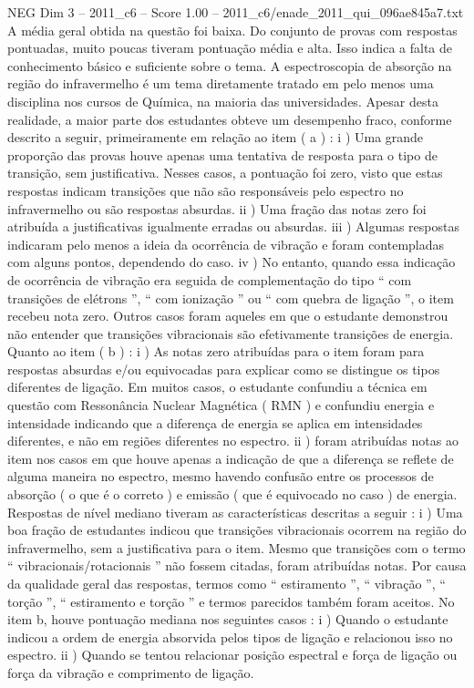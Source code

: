 \begin{textsample}{NEG Dim 3 – 2011\_c6 – Score 1.00 – 2011\_c6/enade\_2011\_qui\_096ae845a7.txt}
A média geral obtida na questão foi baixa.
Do conjunto de provas com respostas pontuadas, muito poucas tiveram pontuação média e alta.
Isso indica a falta de conhecimento básico e suficiente sobre o tema.
A espectroscopia de absorção na região do infravermelho é um tema diretamente tratado em pelo menos uma disciplina nos cursos de Química, na maioria das universidades.
Apesar desta realidade, a maior parte dos estudantes obteve um desempenho fraco, conforme descrito a seguir, primeiramente em relação ao item ( a ) : i ) Uma grande proporção das provas houve apenas uma tentativa de resposta para o tipo de transição, sem justificativa.
Nesses casos, a pontuação foi zero, visto que estas respostas indicam transições que não são responsáveis pelo espectro no infravermelho ou são respostas absurdas. ii ) Uma fração das notas zero foi atribuída a justificativas igualmente erradas ou absurdas. iii ) Algumas respostas indicaram pelo menos a ideia da ocorrência de vibração e foram contempladas com alguns pontos, dependendo do caso. iv ) No entanto, quando essa indicação de ocorrência de vibração era seguida de complementação do tipo “ com transições de elétrons ”, “ com ionização ” ou “ com quebra de ligação ”, o item recebeu nota zero.
Outros casos foram aqueles em que o estudante demonstrou não entender que transições vibracionais são efetivamente transições de energia.
Quanto ao item ( b ) : i ) As notas zero atribuídas para o item foram para respostas absurdas e/ou equivocadas para explicar como se distingue os tipos diferentes de ligação.
Em muitos casos, o estudante confundiu a técnica em questão com Ressonância Nuclear Magnética ( RMN ) e confundiu energia e intensidade indicando que a diferença de energia se aplica em intensidades diferentes, e não em regiões diferentes no espectro. ii ) foram atribuídas notas ao item nos casos em que houve apenas a indicação de que a diferença se reflete de alguma maneira no espectro, mesmo havendo confusão entre os processos de absorção ( o que é o correto ) e emissão ( que é equivocado no caso ) de energia.
Respostas de nível mediano tiveram as características descritas a seguir : i ) Uma boa fração de estudantes indicou que transições vibracionais ocorrem na região do infravermelho, sem a justificativa para o item.
Mesmo que transições com o termo “ vibracionais/rotacionais ” não fossem citadas, foram atribuídas notas.
Por causa da qualidade geral das respostas, termos como “ estiramento ”, “ vibração ”, “ torção ”, “ estiramento e torção ” e termos parecidos também foram aceitos.
No item b, houve pontuação mediana nos seguintes casos : i ) Quando o estudante indicou a ordem de energia absorvida pelos tipos de ligação e relacionou isso no espectro. ii ) Quando se tentou relacionar posição espectral e força de ligação ou força da vibração e comprimento de ligação.

\end{textsample}
